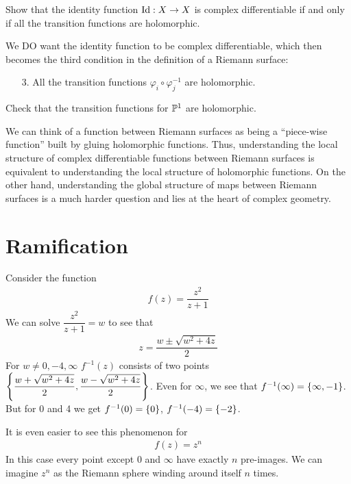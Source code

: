 \documentclass{article}
\begin{document}
\begin{qbox}
  Show that the identity function $\operatorname{Id}: X \rightarrow X$ is complex differentiable if and only if all the transition functions are holomorphic.
\end{qbox}

We DO want the identity function to be complex differentiable, which then becomes the third condition in the definition of a Riemann surface:
\begin{enumerate}
  \item[3.] All the transition functions $\varphi_i \circ \varphi_j^{-1}$ are holomorphic.
\end{enumerate}

\begin{qbox}
  Check that the transition functions for $\mathbb{P}^1$ are holomorphic.
\end{qbox}

We can think of a function between Riemann surfaces as being a ``piece-wise function'' built by gluing holomorphic functions. Thus, understanding the local structure of complex differentiable functions between Riemann surfaces is equivalent to understanding the local structure of holomorphic functions. On the other hand, understanding the global structure of maps between Riemann surfaces is a much harder question and lies at the heart of complex geometry.






\section{Ramification}
Consider the function \begin{align*}
  f(z) = \dfrac{z^2}{z+1}
\end{align*}
We can solve $ \dfrac{z^2}{z+1} = w $ to see that
\begin{align*}
  z = \dfrac{w \pm \sqrt{w^2 + 4z}}{2}
\end{align*}
For $w \neq 0, -4, \infty$ $f^{-1}(z)$ consists of two points $\left\{\dfrac{w + \sqrt{w^2 + 4z}}{2}, \dfrac{w - \sqrt{w^2 + 4z}}{2}\right\}$.
Even for $\infty$, we see that $f^{-1}(\infty) = \left\{\infty, -1\right\}$.
But for 0 and 4 we get $f^{-1}(0) = \left\{0\right\}$, $f^{-1}(-4) = \left\{-2\right\}$.

It is even easier to see this phenomenon for
\begin{align*}
  f(z) = z^n
\end{align*}
In this case every point except $0$ and $\infty$ have exactly $n$ pre-images. We can imagine $z^n$ as the Riemann sphere winding around itself $n$ times.
\end{document}
